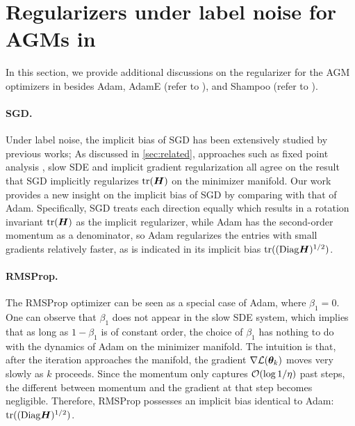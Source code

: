 \section{Regularizers under label noise for AGMs in }
\label{app:regularizer}
In this section, we provide additional discussions on the regularizer for the AGM optimizers in  besides Adam, AdamE (refer to ), and Shampoo (refer to ).

\paragraph{SGD.} Under label noise, the implicit bias of SGD has been extensively studied by previous works; As discussed in \cref{sec:related}, approaches such as fixed point analysis \citep{blanc2020implicit}, slow SDE \citep{li2021happens} and implicit gradient regularization \citep{barrett2020implicit} all agree on the result that SGD implicitly regularizes $\mathrm{tr}({\bm{H}})$ on the minimizer manifold. Our work provides a new insight on the implicit bias of SGD by comparing with that of Adam. Specifically, SGD treats each direction equally which results in a rotation invariant $\mathrm{tr}({\bm{H}})$ as the implicit regularizer, while Adam has the second-order momentum as a denominator, so Adam regularizes the entries with small gradients relatively faster, as is indicated in its implicit bias $\mathrm{tr}((\mathrm{Diag} {\bm{H}})^{1/2})$.

\paragraph{RMSProp.} The RMSProp optimizer \citet{hinton2012neural} can be seen as a special case of Adam, where $\beta_1 = 0$. One can observe that $\beta_1$ does not appear in the slow SDE system, which implies that as long as $1 - \beta_1$ is of constant order, the choice of $\beta_1$ has nothing to do with the dynamics of Adam on the minimizer manifold. The intuition is that, after the iteration approaches the manifold, the gradient $\nabla \mathcal{L}({\bm{\theta}}_k)$ moves very slowly as $k$ proceeds. Since the momentum only captures $\mathcal{O}(\log 1/\eta)$ past steps, the different between momentum and the gradient at that step becomes negligible.
Therefore, RMSProp possesses an implicit bias identical to Adam: $\mathrm{tr}((\mathrm{Diag} {\bm{H}})^{1/2})$.

